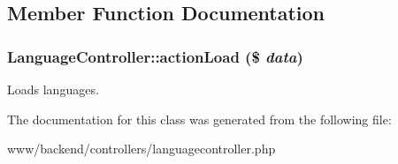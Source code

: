 \subsection{Member Function Documentation}
\hypertarget{classLanguageController_aa4d532a350cf860a85974c63ec36e903}{
\subsubsection[{actionLoad}]{\setlength{\rightskip}{0pt plus 5cm}LanguageController::actionLoad (\$ {\em data})}}
\label{classLanguageController_aa4d532a350cf860a85974c63ec36e903}
Loads languages. 

The documentation for this class was generated from the following file:\begin{DoxyCompactItemize}
\item 
www/backend/controllers/languagecontroller.php\end{DoxyCompactItemize}
